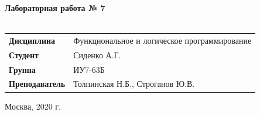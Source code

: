 \documentclass[a4paper,14pt]{extreport} %
\begin{document}
\begin{titlepage}
    \vspace{2cm}

    \begin{center}
        \textbf{Лабораторная работа № 7} \\
        \vspace{0.5cm}
        \textbf{} \\
    \end{center}

    \vspace{4cm}

    \begin{flushleft}
        \begin{tabular}{ll}
            \textbf{Дисциплина} & Функциональное и логическое программирование \\
            \textbf{Студент} & Сиденко А.Г. \\
            \textbf{Группа} & ИУ7-63Б \\
            \textbf{Преподаватель} & Толпинская Н.Б., Строганов Ю.В.  \\
        \end{tabular}
    \end{flushleft}

    \vspace{4cm}

   \begin{center}
        Москва, 2020 г.
    \end{center}

\end{titlepage}
\end{document}
